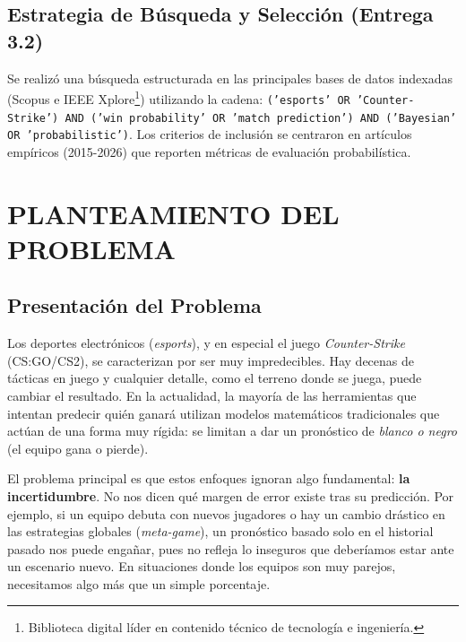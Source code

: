 \documentclass[twocolumn,10pt]{article}
\begin{document}
\subsection{Estrategia de Búsqueda y Selección (Entrega 3.2)}
Se realizó una búsqueda estructurada en las principales bases de datos indexadas (Scopus e IEEE Xplore\footnote{Biblioteca digital líder en contenido técnico de tecnología e ingeniería.}) utilizando la cadena: \texttt{('esports' OR 'Counter-Strike') AND ('win probability' OR 'match prediction') AND ('Bayesian' OR 'probabilistic')}. Los criterios de inclusión se centraron en artículos empíricos (2015-2026) que reporten métricas de evaluación probabilística.

\section{PLANTEAMIENTO DEL PROBLEMA}

\subsection{Presentación del Problema}

Los deportes electrónicos (\textit{esports}), y en especial el juego \textit{Counter-Strike} (CS:GO/CS2), se caracterizan por ser muy impredecibles. Hay decenas de tácticas en juego y cualquier detalle, como el terreno donde se juega, puede cambiar el resultado. En la actualidad, la mayoría de las herramientas que intentan predecir quién ganará utilizan modelos matemáticos tradicionales que actúan de una forma muy rígida: se limitan a dar un pronóstico de \textit{blanco o negro} (el equipo gana o pierde).

El problema principal es que estos enfoques ignoran algo fundamental: \textbf{la incertidumbre}. No nos dicen qué margen de error existe tras su predicción. Por ejemplo, si un equipo debuta con nuevos jugadores o hay un cambio drástico en las estrategias globales (\textit{meta-game}), un pronóstico basado solo en el historial pasado nos puede engañar, pues no refleja lo inseguros que deberíamos estar ante un escenario nuevo. En situaciones donde los equipos son muy parejos, necesitamos algo más que un simple porcentaje.
\end{document}
